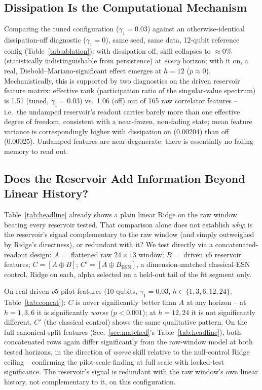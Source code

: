 \documentclass[11pt]{article}
\begin{document}
\subsection{Dissipation Is the Computational Mechanism}
\label{sec:results-mechanism}

Comparing the tuned configuration ($\gamma_1{=}0.03$) against an otherwise-identical
dissipation-off diagnostic ($\gamma_1{=}0$), same seed, same data, 12-qubit reference config
(Table~\ref{tab:ablation}): with dissipation off, skill collapses to $\approx0\%$ (statistically
indistinguishable from persistence) at \emph{every} horizon; with it on, a real,
Diebold--Mariano-significant effect emerges at $h{=}12$ ($p{\approx}0$). Mechanistically, this is
supported by two diagnostics on the driven reservoir feature matrix: effective rank
(participation ratio of the singular-value spectrum) is 1.51 (tuned, $\gamma_1{=}0.03$) vs.\ 1.06
(off) out of 165 raw correlator features -- i.e.\ the undamped reservoir's readout carries barely
more than one effective degree of freedom, consistent with a near-frozen, non-fading state; mean
feature variance is correspondingly higher with dissipation on (0.00204) than off (0.00025).
Undamped features are near-degenerate: there is essentially no fading memory to read out.



\subsection{Does the Reservoir Add Information Beyond Linear History?}
\label{sec:concat}

Table~\ref{tab:headline} already shows a plain linear Ridge on the raw window beating every
reservoir tested. That comparison alone does not establish \emph{why}: is the reservoir's signal
complementary to the raw window (and simply outweighed by Ridge's directness), or redundant with
it? We test directly via a concatenated-readout design: $A{=}$ flattened raw $24\times13$ window;
$B{=}$ driven $v5$ reservoir features; $C{=}[A{\oplus}B]$; $C'{=}[A{\oplus}B_{\text{ESN}}]$, a
dimension-matched classical-ESN control. Ridge on each, alpha selected on a held-out tail of the
fit segment only.

On real driven $v5$ pilot features (10 qubits, $\gamma_1{=}0.03$, $h\in\{1,3,6,12,24\}$,
Table~\ref{tab:concat}): $C$ is never significantly better than $A$ at any horizon -- at $h{=}1,3,6$
it is significantly \emph{worse} ($p{<}0.001$); at $h{=}12,24$ it is not significantly different.
$C'$ (the classical control) shows the same qualitative pattern. On the full canonical-split
features (Sec.~\ref{sec:matched}'s Table~\ref{tab:headline}), both concatenated rows again differ
significantly from the raw-window model at both tested horizons, in the direction of \emph{worse}
skill relative to the null-control Ridge ceiling -- confirming the pilot-scale finding at full
scale with locked-test significance. The reservoir's signal is redundant with the raw window's own
linear history, not complementary to it, on this configuration.
\end{document}
